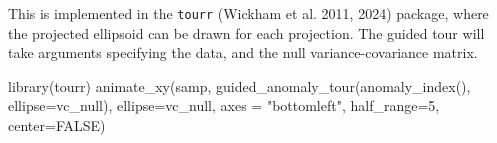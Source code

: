 \documentclass[
  12pt,
]{interact}
\newenvironment{Shaded}{\begin{snugshade}}{\end{snugshade}}
\newcommand{\AttributeTok}[1]{\textcolor[rgb]{0.40,0.45,0.13}{#1}}
\newcommand{\ConstantTok}[1]{\textcolor[rgb]{0.56,0.35,0.01}{#1}}
\newcommand{\DecValTok}[1]{\textcolor[rgb]{0.68,0.00,0.00}{#1}}
\newcommand{\FunctionTok}[1]{\textcolor[rgb]{0.28,0.35,0.67}{#1}}
\newcommand{\NormalTok}[1]{\textcolor[rgb]{0.00,0.23,0.31}{#1}}
\newcommand{\StringTok}[1]{\textcolor[rgb]{0.13,0.47,0.30}{#1}}
\begin{document}
This is implemented in the \texttt{tourr} (Wickham et al. 2011, 2024)
package, where the projected ellipsoid can be drawn for each projection.
The guided tour will take arguments specifying the data, and the null
variance-covariance matrix.

\begin{Shaded}
\begin{Highlighting}[]
\FunctionTok{library}\NormalTok{(tourr)}
\FunctionTok{animate\_xy}\NormalTok{(samp, }\FunctionTok{guided\_anomaly\_tour}\NormalTok{(}\FunctionTok{anomaly\_index}\NormalTok{(),}
  \AttributeTok{ellipse=}\NormalTok{vc\_null), }\AttributeTok{ellipse=}\NormalTok{vc\_null, }
  \AttributeTok{axes =} \StringTok{"bottomleft"}\NormalTok{, }\AttributeTok{half\_range=}\DecValTok{5}\NormalTok{, }\AttributeTok{center=}\ConstantTok{FALSE}\NormalTok{)}
\end{Highlighting}
\end{Shaded}
\end{document}
